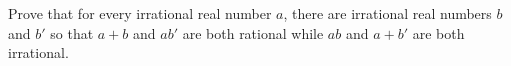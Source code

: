 Prove that for every irrational real number $a$, there are irrational real numbers $b$ and $b'$ so that $a+b$ and $ab'$ are both rational while $ab$ and $a+b'$ are both irrational.
